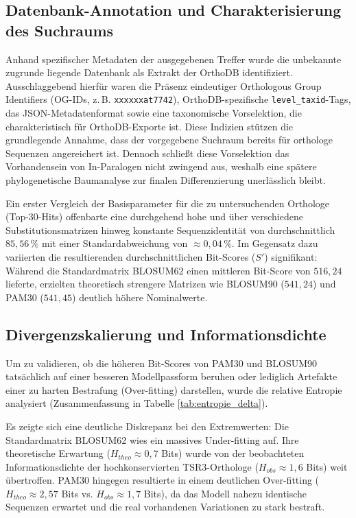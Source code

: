\documentclass[11pt, a4paper]{article}
\begin{document}
\subsection{Datenbank-Annotation und Charakterisierung des Suchraums}

Anhand spezifischer Metadaten der ausgegebenen Treffer wurde die unbekannte zugrunde liegende Datenbank als Extrakt der OrthoDB identifiziert. Ausschlaggebend hierfür waren die Präsenz eindeutiger Orthologous Group Identifiers (OG-IDs, z.\,B. \texttt{xxxxxxat7742}), OrthoDB-spezifische \texttt{level\_taxid}-Tags, das JSON-Metadatenformat sowie eine taxonomische Vorselektion, die charakteristisch für OrthoDB-Exporte ist.  Diese Indizien stützen die grundlegende Annahme, dass der vorgegebene Suchraum bereits für orthologe Sequenzen angereichert ist. Dennoch schließt diese Vorselektion das Vorhandensein von In-Paralogen nicht zwingend aus, weshalb eine spätere phylogenetische Baumanalyse zur finalen Differenzierung unerlässlich bleibt.

Ein erster Vergleich der Basisparameter für die zu untersuchenden Orthologe (Top-30-Hits) offenbarte eine durchgehend hohe und über verschiedene Substitutionsmatrizen hinweg konstante Sequenzidentität von durchschnittlich $85{,}56\,\%$ mit einer Standardabweichung von $\approx 0{,}04\,\%$. Im Gegensatz dazu variierten die resultierenden durchschnittlichen Bit-Scores ($S'$) signifikant: Während die Standardmatrix BLOSUM62 einen mittleren Bit-Score von $516{,}24$ lieferte, erzielten theoretisch strengere Matrizen wie BLOSUM90 ($541{,}24$) und PAM30 ($541{,}45$) deutlich höhere Nominalwerte. 

\subsection{Divergenzskalierung und Informationsdichte}
Um zu validieren, ob die höheren Bit-Scores von PAM30 und BLOSUM90 tatsächlich auf einer besseren Modellpassform beruhen oder lediglich Artefakte einer zu harten Bestrafung (Over-fitting) darstellen, wurde die relative Entropie analysiert (Zusammenfassung in Tabelle \ref{tab:entropie_delta}).

Es zeigte sich eine deutliche Diskrepanz bei den Extremwerten: Die Standardmatrix BLOSUM62 wies ein massives Under-fitting auf. Ihre theoretische Erwartung ($H_{theo} \approx 0{,}7$ Bits) wurde von der beobachteten Informationsdichte der hochkonservierten TSR3-Orthologe ($H_{obs} \approx 1{,}6$ Bits) weit übertroffen. PAM30 hingegen resultierte in einem deutlichen Over-fitting ($H_{theo} \approx 2{,}57$ Bits vs. $H_{obs} \approx 1{,}7$ Bits), da das Modell nahezu identische Sequenzen erwartet und die real vorhandenen Variationen zu stark bestraft. 
\end{document}
